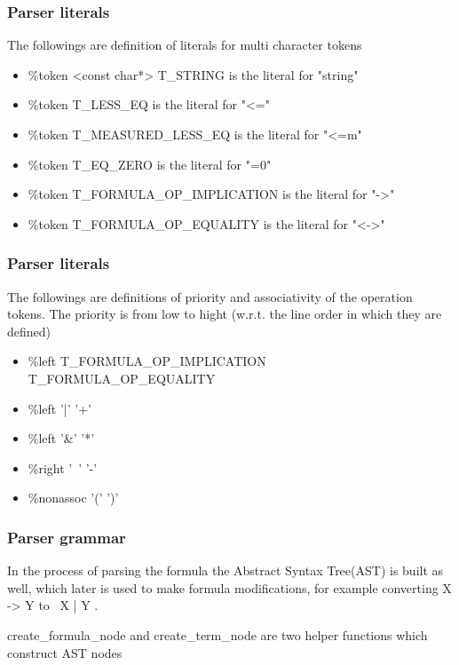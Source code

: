 \documentclass{article}
\begin{document}
		\subsubsection*{Parser literals}
			The followings are definition of literals for multi character tokens
			\begin{itemize}
				\item \%token <const char*> T\_STRING is the literal for "string"
				\item \%token T\_LESS\_EQ is the literal for "<="
				\item \%token T\_MEASURED\_LESS\_EQ is the literal for "<=m"
				\item \%token T\_EQ\_ZERO is the literal for "=0"
				\item \%token T\_FORMULA\_OP\_IMPLICATION is the literal for "->"
				\item \%token T\_FORMULA\_OP\_EQUALITY is the literal for "<->"
			\end{itemize}

		\subsubsection*{Parser literals}
			The followings are definitions of priority and associativity of the operation tokens. 
			The priority is from low to hight (w.r.t. the line order in which they are defined)
			\begin{itemize}
				\item \%left T\_FORMULA\_OP\_IMPLICATION T\_FORMULA\_OP\_EQUALITY
				\item \%left '|' '+'
				\item \%left '\&' '*'
				\item \%right '~' '-'
				\item \%nonassoc '(' ')'
			\end{itemize}

		\subsubsection*{Parser grammar}
			In the process of parsing the formula the Abstract Syntax Tree(AST) is built as well, 
			which later is used to make formula modifications, for example converting X -> Y to ~X | Y .
			
			create\_formula\_node and create\_term\_node are two helper functions which construct AST nodes
\end{document}
